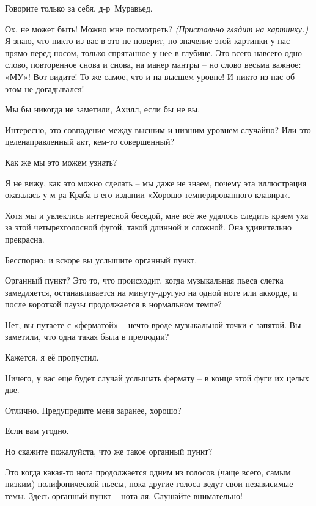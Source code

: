 \documentclass[../main.tex]{subfiles}
\begin{document}
\begin{dialogue}
 Говорите только за себя, д-р~Муравьед.

 Ох, не может быть! Можно мне посмотреть? \emph{(Пристально глядит на картинку.)} Я знаю, что никто из вас в это не поверит, но значение этой картинки у нас прямо перед носом, только спрятанное у нее в глубине. Это всего-навсего одно слово, повторенное снова и снова, на манер мантры \--- но слово весьма важное: «МУ»! Вот видите! То же самое, что и на высшем уровне! И никто из нас об этом не догадывался!

 Мы бы никогда не заметили, Ахилл, если бы не вы.

 Интересно, это совпадение между высшим и низшим уровнем случайно? Или это целенаправленный акт, кем-то совершенный?

 Как же мы это можем узнать?

 Я не вижу, как это можно сделать \--- мы даже не знаем, почему эта иллюстрация оказалась у м-ра Краба в его издании «Хорошо темперированного клавира».

 Хотя мы и увлеклись интересной беседой, мне всё же удалось следить краем уха за этой четырехголосной фугой, такой длинной и сложной. Она удивительно прекрасна.

 Бесспорно; и вскоре вы услышите органный пункт.

 Органный пункт? Это то, что происходит, когда музыкальная пьеса слегка замедляется, останавливается на минуту-другую на одной ноте или аккорде, и после короткой паузы продолжается в нормальном темпе?

 Нет, вы путаете с «ферматой» \--- нечто вроде музыкальной точки с запятой. Вы заметили, что одна такая была в прелюдии?

 Кажется, я её пропустил.

 Ничего, у вас еще будет случай услышать фермату \--- в конце этой фуги их целых две.

 Отлично. Предупредите меня заранее, хорошо?

 Если вам угодно.

 Но скажите пожалуйста, что же такое органный пункт?

 Это когда какая-то нота продолжается одним из голосов (чаще всего, самым низким) полифонической пьесы, пока другие голоса ведут свои независимые темы. Здесь органный пункт \--- нота ля. Слушайте внимательно!


\end{dialogue}
\end{document}
